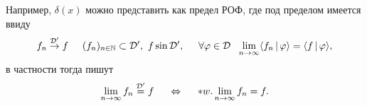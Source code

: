 Например, $\delta(x)$ можно представить как предел РОФ, где под пределом имеется ввиду
\begin{equation*}
    f_n \overset{\mathcal D'}{\to} f \hspace{5 mm} 
    (f_n)_{n\in \mathbb{N}} \subset \mathcal D', \ f \sin \mathcal D',
    \hspace{5 mm} 
    \forall \varphi \in \mathcal D \ \ \lim_{n \to \infty} \langle f_n \,|\, \varphi \rangle  = \langle f \,|\, \varphi \rangle,
\end{equation*}
в частности тогда пишут
\begin{equation*}
    \lim_{n \to \infty} f_n \overset{\mathcal D'}{=} f 
    \hspace{5 mm} \Leftrightarrow \hspace{5 mm} 
    *w. \lim_{n \to \infty} f_n = f. 
\end{equation*}














